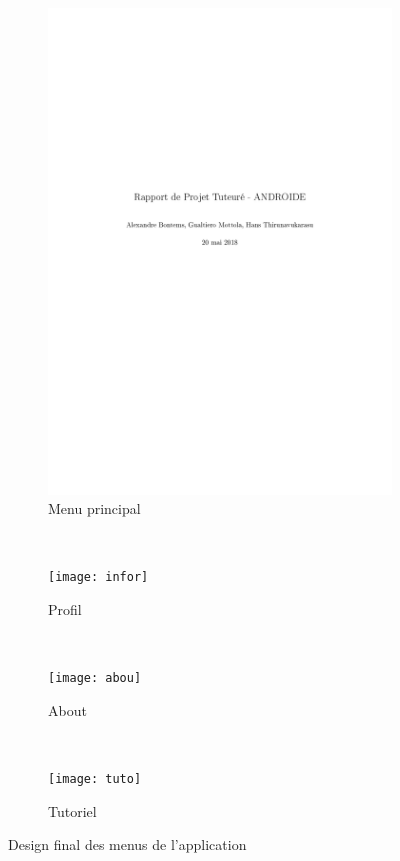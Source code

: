\documentclass[../main.tex]{subfiles}
\begin{document}
\begin{figure}[h!]
    \centering
    \begin{subfigure}{0.34\textwidth}
        \centering
        \includegraphics[width=\linewidth]{main}
        \caption{Menu principal}
    \end{subfigure}
    ~
    \begin{subfigure}{0.34\textwidth}
        \centering
        \texttt{[image: infor]}
        \caption{Profil}
    \end{subfigure}
    ~
    \begin{subfigure}{0.34\textwidth}
        \centering
        \texttt{[image: abou]}
        \caption{About}
    \end{subfigure}
    ~
    \begin{subfigure}{0.34\textwidth}
        \centering
        \texttt{[image: tuto]}
        \caption{Tutoriel}
    \end{subfigure}
    \caption{Design final des menus de l'application}
    \label{fig-screen1}
\end{figure}
 
\end{document}
